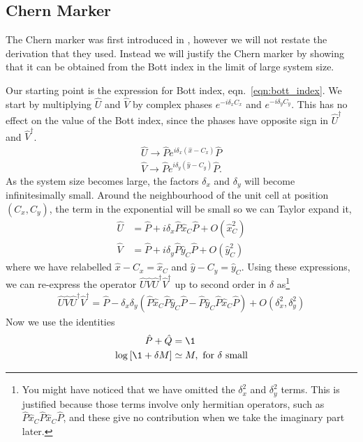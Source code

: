  
 
\subsection{Chern Marker}

The Chern marker was first introduced in \cite{bianco_mapping_2011}, however we will not restate the derivation that they used. Instead we will justify the Chern marker by showing that it can be obtained from the Bott index in the limit of large system size.\par
Our starting point is the expression for Bott index, eqn.~\ref{eqn:bott_index}. We start by multiplying $\hat U$  and $\hat V$ by complex phases $e^{-i \delta_x C_x}$ and $e^{-i \delta_y C_y}$. This has no effect on the value of the Bott index, since the phases have opposite sign in $\hat U ^\dag$ and $\hat V ^\dag$.
\begin{align}
	\hat U  \rightarrow \hat P e^{i \delta_x (\hat x - C_x)} \hat P \\
	\hat V  \rightarrow \hat P e^{i \delta_y (\hat y - C_y)} \hat P.
\end{align}
As the system size becomes large, the factors $\delta_x$ and $\delta_y$ will become infinitesimally small. Around the neighbourhood of the unit cell at position $(C_x, C_y)$, the term in the exponential will be small so we can Taylor expand it,
\begin{align}
	\hat U &=  \hat P + i \delta_x \hat P \hat x_C \hat P + O(\hat x_C^2)\\
	\hat V &= \hat P + i \delta_y \hat P \hat y_C \hat P + O(\hat y_C^2)
\end{align}
where we have relabelled $ \hat x - C_x= \hat x_C$ and $ \hat y - C_y= \hat y_C$.  Using these expressions, we can re-express the operator $\hat U\hat V\hat U^\dag \hat V^\dag$ up to second order in $\delta$ as\footnote{You might have noticed that we have omitted the $\delta_x^2$ and $\delta_y^2$ terms. This is justified because those terms involve only hermitian operators, such as $ \hat P \hat x_C \hat P \hat x_C \hat P$, and these give no contribution when we take the imaginary part later.}
\begin{align}
 	\hat U\hat V\hat U^\dag \hat V^\dag = \hat P  - \delta_x \delta_y \left (  \hat P \hat x_C \hat P \hat y_C \hat P  -  \hat P \hat y_C \hat P \hat x_C \hat P \right ) + O(\delta_x^2, \delta_y^2)
\end{align}
Now we use the identities 
\begin{align}
	\hat P + \hat Q &= \1\\
	\log \left [ \1 + \delta M \right ] & \simeq M, \textup{  for  } \delta \textup{ small} 
\end{align}
